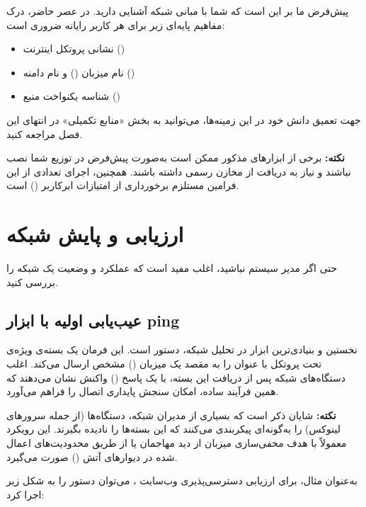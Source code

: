 پیش‌فرض ما بر این است که شما با مبانی شبکه آشنایی دارید. در عصر حاضر، درک مفاهیم پایه‌ای زیر برای هر کاربر رایانه ضروری است:

\begin{itemize}
  \item نشانی پروتکل اینترنت ()
  \item نام میزبان () و نام دامنه ()
  \item شناسه یکنواخت منبع ()
\end{itemize}

جهت تعمیق دانش خود در این زمینه‌ها، می‌توانید به بخش «منابع تکمیلی» در انتهای این فصل مراجعه کنید.

\begin{note}
\textbf{نکته:} برخی از ابزارهای مذکور ممکن است به‌صورت پیش‌فرض در توزیع شما نصب نباشند و نیاز به دریافت از مخازن رسمی داشته باشند. همچنین، اجرای تعدادی از این فرامین مستلزم برخورداری از امتیازات ابرکاربر () است.
\end{note}

\section{ارزیابی و پایش شبکه}

حتی اگر مدیر سیستم نباشید، اغلب مفید است که عملکرد و وضعیت یک شبکه را بررسی کنید.

\subsection{عیب‌یابی اولیه با ابزار ping}

نخستین و بنیادی‌ترین ابزار در تحلیل شبکه، دستور  است. این فرمان یک بسته‌ی ویژه‌ی تحت پروتکل  با عنوان  را به مقصد یک میزبان () مشخص ارسال می‌کند. اغلب دستگاه‌های شبکه پس از دریافت این بسته، با یک پاسخ () واکنش نشان می‌دهند که همین فرآیند ساده، امکان سنجش پایداری اتصال را فراهم می‌آورد.

\begin{note}
\textbf{نکته:} شایان ذکر است که بسیاری از مدیران شبکه، دستگاه‌ها (از جمله سرورهای لینوکس) را به‌گونه‌ای پیکربندی می‌کنند که این بسته‌ها را نادیده بگیرند. این رویکرد معمولاً با هدف مخفی‌سازی میزبان از دید مهاجمان یا از طریق محدودیت‌های اعمال شده در دیوارهای آتش () صورت می‌گیرد.
\end{note}

به‌عنوان مثال، برای ارزیابی دسترسی‌پذیری وب‌سایت ، می‌توان دستور را به شکل زیر اجرا کرد:

